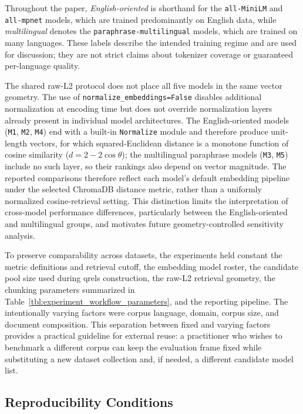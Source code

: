 Throughout the paper, \emph{English-oriented} is shorthand for the \texttt{all-MiniLM} and \texttt{all-mpnet} models, which are trained predominantly on English data, while \emph{multilingual} denotes the \texttt{paraphrase-multilingual} models, which are trained on many languages. These labels describe the intended training regime and are used for discussion; they are not strict claims about tokenizer coverage or guaranteed per-language quality.

The shared raw-L2 protocol does not place all five models in the same vector geometry. The use of \texttt{normalize\_embeddings=False} disables additional normalization at encoding time but does not override normalization layers already present in individual model architectures. The English-oriented models (\texttt{M1}, \texttt{M2}, \texttt{M4}) end with a built-in \texttt{Normalize} module and therefore produce unit-length vectors, for which squared-Euclidean distance is a monotone function of cosine similarity ($d=2-2\cos\theta$); the multilingual paraphrase models (\texttt{M3}, \texttt{M5}) include no such layer, so their rankings also depend on vector magnitude. The reported comparisons therefore reflect each model's default embedding pipeline under the selected ChromaDB distance metric, rather than a uniformly normalized cosine-retrieval setting. This distinction limits the interpretation of cross-model performance differences, particularly between the English-oriented and multilingual groups, and motivates future geometry-controlled sensitivity analysis.

To preserve comparability across datasets, the experiments held constant the metric definitions and retrieval cutoff, the embedding model roster, the candidate pool size used during qrels construction, the raw-L2 retrieval geometry, the chunking parameters summarized in Table~\ref{tbl:experiment_workflow_parameters}, and the reporting pipeline. The intentionally varying factors were corpus language, domain, corpus size, and document composition. This separation between fixed and varying factors provides a practical guideline for external reuse: a practitioner who wishes to benchmark a different corpus can keep the evaluation frame fixed while substituting a new dataset collection and, if needed, a different candidate model list.

\subsection{Reproducibility Conditions}\label{reproducibility-conditions}


